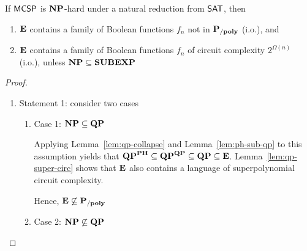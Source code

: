 \documentclass[12pt]{article}
\theoremstyle{definition}
\begin{document}
\begin{theorem}[Theorem 15]
If $\mathsf{MCSP}$ is $\mathbf{NP}$-hard under a natural reduction from $\mathsf{SAT}$, then
\begin{enumerate} [1.]
	\item $\mathbf{E}$ contains a family of Boolean functions $f_n$ not in $\mathbf{P_{/poly}}$ (i.o.), and
	\item $\mathbf{E}$ contains a family of Boolean functions $f_n$ of circuit complexity $2^{\Omega(n)}$ (i.o.), unless $\mathbf{NP} \subseteq \mathbf{SUBEXP}$
\end{enumerate}
\end{theorem}

\begin{proof}
\begin{enumerate}[-]
	\item Statement 1: consider two cases
	\begin{enumerate} [+]
		\item Case 1: $\mathbf{NP} \subseteq \mathbf{QP}$
		

      Applying Lemma~\ref{lem:qp-collapse} and Lemma~\ref{lem:ph-sub-qp} to this assumption yields that
      $\mathbf{QP}^{\mathbf{PH}} \subseteq \mathbf{QP}^{\mathbf{QP}} \subseteq
       \mathbf{QP} \subseteq \mathbf{E}$.
      Lemma~\ref{lem:qp-super-circ} shows that $\mathbf{E}$ also contains
      a language of superpolynomial circuit complexity.

		
		Hence, $\mathbf{E} \not\subseteq \mathbf{P_{/poly}}$\\
		
		\item Case 2: $\mathbf{NP} \not\subseteq \mathbf{QP}$
		

\end{enumerate}
\end{enumerate}
\end{proof}
\end{document}
